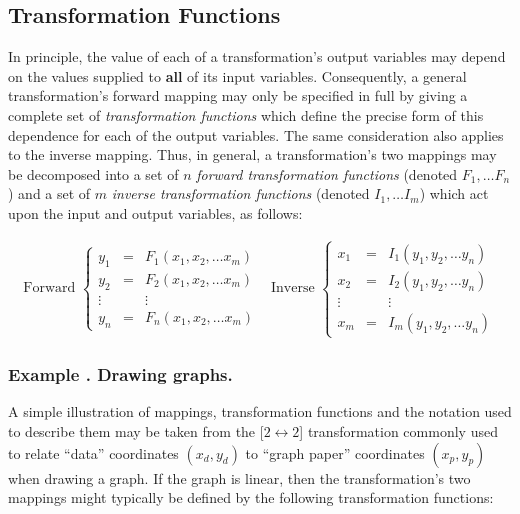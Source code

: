 \documentclass[twoside,nolof,11pt]{starlink}
\newcounter{examplecounter}
\providecommand{\example}[1]{\addtocounter{examplecounter}{1}
                         \subsubsection*{Example \theexamplecounter. #1}}
\begin{document}
\subsection{Transformation Functions}

In principle, the value of each of a transformation's output variables may
depend on the values supplied to \textbf{all} of its input variables.
Consequently, a general transformation's forward mapping may only be
specified in full by giving a complete set of \emph{transformation functions}
which define the precise form of this dependence for each of the output
variables.
The same consideration also applies to the inverse mapping.
Thus, in general, a transformation's two mappings may be decomposed into a
set of $n$ \emph{forward transformation functions} (denoted \mbox{$F_1,\ldots
F_n$}) and a set of $m$ \emph{inverse transformation functions} (denoted
\mbox{$I_1,\ldots I_m$}) which act upon the input and output variables, as
follows:

\begin{equation}
\begin{array}{cc}
\mbox{Forward }
\left\{
\begin{array}{ccc}
y_1 & = & F_1(x_1, x_2,\ldots x_m)\\
y_2 & = & F_2(x_1, x_2,\ldots x_m)\\
\vdots & & \vdots\\
y_n & = & F_n(x_1, x_2,\ldots x_m)
\end{array}
\right.
&
\mbox{Inverse }
\left\{
\begin{array}{ccc}
x_1 & = & I_1(y_1, y_2,\ldots y_n)\\
x_2 & = & I_2(y_1, y_2,\ldots y_n)\\
\vdots & & \vdots\\
x_m & = & I_m(y_1, y_2,\ldots y_n)
\end{array}
\right.
\end{array}
\label{equation:transformationfunctions}
\end{equation}

\example{Drawing graphs.}
A simple illustration of mappings, transformation functions and the notation
used to describe them may be taken from the \mbox{[$2 \leftrightarrow 2$]}
transformation commonly used to relate ``data'' coordinates $(x_d,y_d)$ to
``graph paper'' coordinates $(x_p,y_p)$ when drawing a graph.
If the graph is linear, then the transformation's two mappings might
typically be defined by the following transformation functions:
\end{document}
